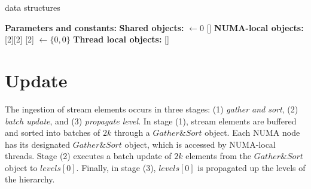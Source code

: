 \begin{algorithm}[h]
\caption{\mysketch data structures} \label{alg:data_organization}
    \begin{algorithmic}[1] 
    \setcounter{ALG@line}{\value{mycounter}}
    \State \textbf{Parameters and constants:}
        \State \hspace{\algorithmicindent}  
        \State \hspace{\algorithmicindent}  
        \State \hspace{\algorithmicindent}  
        \State \hspace{\algorithmicindent}  
    \State
    \State \textbf{Shared objects:} \;
        \State \hspace{\algorithmicindent}  $\gets 0$ 
        \State \hspace{\algorithmicindent} []
    \State
    \State \textbf{NUMA-local objects:} 
        \State \hspace{\algorithmicindent} [2][2]
        \State \hspace{\algorithmicindent} [2] $\gets \{0,0\}$
    \State
    \State \textbf{Thread local objects:}
        \State \hspace{\algorithmicindent} []
        \State \hspace{\algorithmicindent}  
        \State \hspace{\algorithmicindent}  
        \setcounter{mycounter}{\value{ALG@line}}
    \end{algorithmic}
\end{algorithm}

\section{Update} \label{sec:update_alg} %
The ingestion of stream elements occurs in three stages: 
(1) \emph{gather and sort}, 
(2) \emph{batch update}, and 
(3) \emph{propagate level}. 
In stage (1), stream elements are buffered and sorted into batches of $2k$ through a $\mathit{Gather\&Sort}$ object. Each NUMA node has its designated $\mathit{Gather\&Sort}$ object, which is accessed by NUMA-local threads. 
Stage (2) executes a batch update of $2k$ elements from the $\mathit{Gather\&Sort}$ object to $levels[0]$. 
Finally, in stage (3), $levels[0]$ is propagated up the levels of the hierarchy.

